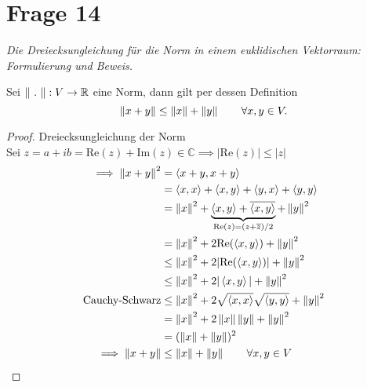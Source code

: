 \section{Frage 14}
\textit{Die Dreiecksungleichung für die Norm in einem euklidischen Vektorraum: 
Formulierung und Beweis.}

\begin{definition}
    Sei $\norm{\ .\ } : V \to \mathbb{R}$ eine Norm, dann gilt per dessen Definition
    \[
        \norm{x + y} \leq \norm{x} + \norm{y}\qquad\forall x,y\in V
    .\]
\end{definition}
\begin{proof} Dreiecksungleichung der Norm\\
    Sei $z = a+ib=\textrm{Re}(z) + \textrm{Im}(z)\in \mathbb{C} \implies \vert\mathrm{Re}(z)\vert \leq \vert z\vert$
    \begin{align*}
        \implies \norm{x+y}^2 &= \inner{x+y}{x+y}\\
        &= \inner{x}{x} + \inner{x}{y} + \inner{y}{x} + \inner{y}{y}\\
        &= \norm{x}^2 + \underbrace{\inner{x}{y} + \overline{\inner{x}{y}}}_{\text{Re}(z) = (z + \overline{z}) / 2} + \norm{y}^2\\
        &= \norm{x}^2 + 2\textrm{Re}(\inner{x}{y}) + \norm{y}^2\\
        &\leq \norm{x}^2 + 2\vert \textrm{Re}(\inner{x}{y}) \vert + \norm{y}^2\\
        &\leq \norm{x}^2 + 2\vert \inner{x}{y}\vert + \norm{y}^2\\
        \text{Cauchy-Schwarz} &\leq \norm{x}^2 + 2 \sqrt{\inner{x}{x}}\sqrt{\inner{y}{y}} + \norm{y}^2\\
        &=\norm{x}^2 + 2 \norm{x}\norm{y} + \norm{y}^2\\
        &= (\norm{x} + \norm{y})^2\\
        \implies \norm{x + y} &\leq \norm{x} + \norm{y}\qquad\forall x,y\in V
    \end{align*}
\end{proof}